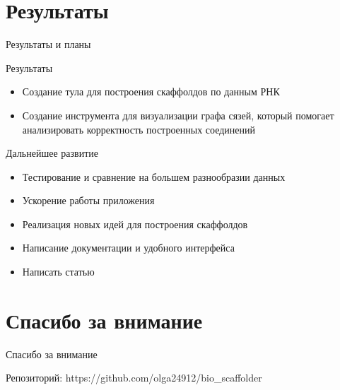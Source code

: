 \documentclass{beamer}
\begin{document}
\section{Результаты}
\begin{frame}[t]{Результаты и планы}
	\begin{block}{Результаты}
		\begin{itemize}
			\item Создание тула для построения скаффолдов по данным РНК 
			\item Создание инструмента для визуализации графа сязей, который помогает анализировать
			корректность построенных соединений   
		\end{itemize}
	\end{block}
	\begin{block}{Дальнейшее развитие}
		\begin{itemize}
			\item Тестирование и сравнение на большем разнообразии данных
			\item Ускорение работы приложения  
			\item Реализация новых идей для построения скаффолдов 
			\item Написание документации и удобного интерфейса
			\item Написать статью
			\end{itemize}
	\end{block}
\end{frame}


\section{Спасибо за внимание}
\begin{frame}{Спасибо за внимание}
    \begin{center}
        Репозиторий: https://github.com/olga24912/bio\_scaffolder
    \end{center}
\end{frame}
\end{document}
